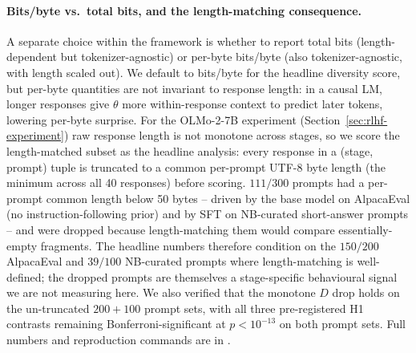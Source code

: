 \paragraph{Bits/byte vs.\ total bits, and the length-matching consequence.}
A separate choice within the framework is whether to report total bits (length-dependent but tokenizer-agnostic) or per-byte bits/byte (also tokenizer-agnostic, with length scaled out).
We default to bits/byte for the headline diversity score, but per-byte quantities are not invariant to response length: in a causal LM, longer responses give $\theta$ more within-response context to predict later tokens, lowering per-byte surprise.
For the OLMo-2-7B experiment (Section~\ref{sec:rlhf-experiment}) raw response length is not monotone across stages, so we score the length-matched subset as the headline analysis: every response in a (stage, prompt) tuple is truncated to a common per-prompt UTF-8 byte length (the minimum across all 40 responses) before scoring.
$111/300$ prompts had a per-prompt common length below 50 bytes -- driven by the base model on AlpacaEval (no instruction-following prior) and by SFT on NB-curated short-answer prompts -- and were dropped because length-matching them would compare essentially-empty fragments.
The headline numbers therefore condition on the $150/200$ AlpacaEval and $39/100$ NB-curated prompts where length-matching is well-defined; the dropped prompts are themselves a stage-specific behavioural signal we are not measuring here.
We also verified that the monotone $D$ drop holds on the un-truncated $200+100$ prompt sets, with all three pre-registered H1 contrasts remaining Bonferroni-significant at $p<10^{-13}$ on both prompt sets.
Full numbers and reproduction commands are in .

